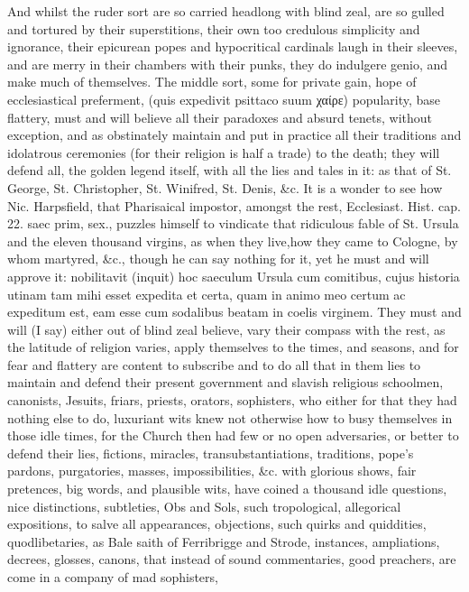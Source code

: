 {And whilst the ruder sort are so carried headlong with blind zeal, are
so gulled and tortured by their superstitions, their own too credulous
simplicity and ignorance, their epicurean popes and hypocritical
cardinals laugh in their sleeves, and are merry in their chambers with
their punks, they do indulgere genio, and make much of themselves. The
middle sort, some for private gain, hope of ecclesiastical preferment,
(quis expedivit psittaco suum χαίρε) popularity, base flattery, must
and will believe all their paradoxes and absurd tenets, without
exception, and as obstinately maintain and put in practice all their
traditions and idolatrous ceremonies (for their religion is half a
trade) to the death; they will defend all, the golden legend itself,
with all the lies and tales in it: as that of St. George, St.
Christopher, St. Winifred, St. Denis, \&c. It is a wonder to see how
Nic. Harpsfield, that Pharisaical impostor, amongst the rest,
Ecclesiast. Hist. cap. 22. saec prim, sex., puzzles himself to
vindicate that ridiculous fable of St. Ursula and the eleven thousand
virgins, as when they live,how they came to Cologne, by whom
martyred, \&c., though he can say nothing for it, yet he must and will
approve it: nobilitavit (inquit) hoc saeculum Ursula cum comitibus,
cujus historia utinam tam mihi esset expedita et certa, quam in animo
meo certum ac expeditum est, eam esse cum sodalibus beatam in coelis
virginem. They must and will (I say) either out of blind zeal believe,
vary their compass with the rest, as the latitude of religion varies,
apply themselves to the times, and seasons, and for fear and flattery
are content to subscribe and to do all that in them lies to maintain
and defend their present government and slavish religious schoolmen,
canonists, Jesuits, friars, priests, orators, sophisters, who either
for that they had nothing else to do, luxuriant wits knew not otherwise
how to busy themselves in those idle times, for the Church then had few
or no open adversaries, or better to defend their lies, fictions,
miracles, transubstantiations, traditions, pope's pardons, purgatories,
masses, impossibilities, \&c. with glorious shows, fair pretences, big
words, and plausible wits, have coined a thousand idle questions, nice
distinctions, subtleties, Obs and Sols, such tropological, allegorical
expositions, to salve all appearances, objections, such quirks and
quiddities, quodlibetaries, as Bale saith of Ferribrigge and Strode,
instances, ampliations, decrees, glosses, canons, that instead of sound
commentaries, good preachers, are come in a company of mad sophisters,
}
